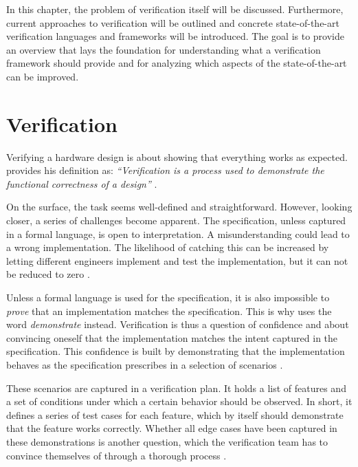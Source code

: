 In this chapter, the problem of verification itself will be discussed. Furthermore, current approaches to
verification will be outlined and concrete state-of-the-art verification languages and frameworks will be introduced.
The goal is to provide an overview that lays the foundation for understanding what a verification framework should
provide and for analyzing which aspects of the state-of-the-art can be improved.

\section{Verification} %

Verifying a hardware design is about showing that everything works as expected. \citeauthor{bergeron2012writing}
provides his definition as: \textit{``Verification is a process used to demonstrate the functional correctness of a
design''} \cite[Ch. 1]{bergeron2012writing}.

On the surface, the task seems well-defined and straightforward. However, looking closer, a series of challenges
become apparent. The specification, unless captured in a formal language, is open to interpretation. A
misunderstanding could lead to a wrong implementation. The likelihood of catching this can be increased by
letting different engineers implement and test the implementation, but it can not be reduced to zero \cite[Ch.
1]{bergeron2012writing}.

Unless a formal language is used for the specification, it is also impossible to \textit{prove} that an
implementation matches the specification. This is why \citeauthor{bergeron2012writing} uses the word
\textit{demonstrate} instead. Verification is thus a question of confidence and about convincing oneself that the
implementation matches the intent captured in the specification. This confidence is built by demonstrating that the
implementation behaves as the specification prescribes in a selection of scenarios \cite[Ch. 1]{bergeron2012writing}.

These scenarios are captured in a verification plan. It holds a list of features and a set of conditions under which
a certain behavior should be observed. In short, it defines a series of test cases for each feature, which by itself
should demonstrate that the feature works correctly. Whether all edge cases have been captured in these
demonstrations is another question, which the verification team has to convince themselves of through a thorough
process \cite[Ch. 1]{bergeron2012writing}.

